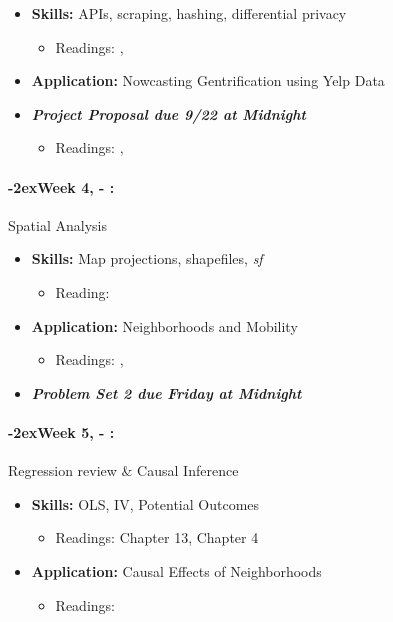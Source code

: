 \documentclass[11pt]{article}
\newcommand{\week}[1]{%
  \paragraph*{\kern-2ex\quad #1, \AdvanceDate[1]\syldate{\today} - \AdvanceDate[2]\syldate{\today}:}%
  \ifdim\wd1=\wd\MONDAY
    \AdvanceDate[7]
  \else
    \AdvanceDate[7]
  \fi%
}
\begin{document}
\begin{itemize}
\item \textbf{Skills:} APIs, scraping, hashing, differential privacy
\begin{itemize}
  \item Readings: \textbf{\cite{chetty2019privacy}}, \cite{abowd2019privacy}
\end{itemize}
\item \textbf{Application:} Nowcasting Gentrification using Yelp Data
\item \textit{\textbf{Project Proposal due 9/22 at Midnight}}
\begin{itemize}
  \item Readings: \textbf{\cite{glaeser2018gentrification}}, \cite{glaeser2017local}
\end{itemize}
\end{itemize} 
\week{Week 4} Spatial Analysis
\begin{itemize}
  \item \textbf{Skills:} Map projections, shapefiles, \textit{sf}
  \begin{itemize}
    \item Reading: 
  \end{itemize}
  \item \textbf{Application:} Neighborhoods and Mobility
  \begin{itemize}
    \item Readings:  \textbf{\cite{chetty2018opportunityatlas}}, 
  \end{itemize}
  \item \textit{\textbf{Problem Set 2 due Friday at Midnight}}
\end{itemize}
\week{Week 5} Regression review \& Causal Inference
\begin{itemize}
  \item \textbf{Skills:} OLS, IV, Potential Outcomes
  \begin{itemize}
    \item Readings: \cite{hungtintonklein2023effect} Chapter 13, \cite{cunningham2023mixtape} Chapter 4
  \end{itemize}
  \item \textbf{Application:} Causal Effects of Neighborhoods
  \begin{itemize}
    \item Readings: \textbf{\cite{chetty2016moving}}
  \end{itemize}
\end{itemize}
\end{document}
